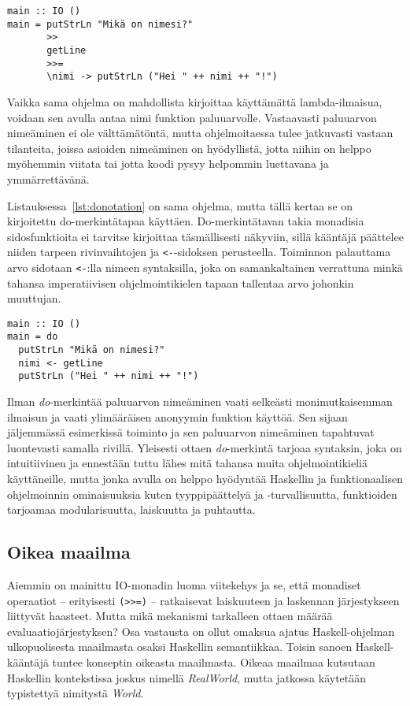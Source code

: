 \documentclass[finnish]{tktltiki2}
\begin{document}
\begin{lstlisting}[float,label={lst:desugared},caption={Funktionaalinen tyyli}]
main :: IO ()
main = putStrLn "Mikä on nimesi?"
       >>
       getLine
       >>=
       \nimi -> putStrLn ("Hei " ++ nimi ++ "!")
\end{lstlisting}

Vaikka sama ohjelma on mahdollista kirjoittaa käyttämättä lambda-ilmaisua, voidaan sen avulla antaa
nimi funktion  paluuarvolle. Vastaavasti paluuarvon nimeäminen ei ole välttämätöntä,
mutta ohjelmoitaessa tulee jatkuvasti vastaan tilanteita, joissa asioiden nimeäminen on hyödyllistä,
jotta niihin on helppo myöhemmin viitata tai jotta koodi pysyy helpommin luettavana ja
ymmärrettävänä.

Listauksessa~\ref{lst:donotation} on sama ohjelma, mutta tällä kertaa se on kirjoitettu
do-merkintätapaa käyttäen. Do-merkintätavan takia monadisia sidosfunktioita ei tarvitse kirjoittaa
täsmällisesti näkyviin, sillä kääntäjä päättelee niiden tarpeen rivinvaihtojen ja \verb|<-|-sidoksen
perusteella. Toiminnon  palauttama arvo sidotaan \verb|<-|:lla nimeen syntaksilla,
joka on samankaltainen verrattuna minkä tahansa imperatiivisen ohjelmointikielen tapaan tallentaa
arvo johonkin muuttujan.

\begin{lstlisting}[float,label={lst:donotation},caption={Imperatiivinen tyyli ja do-merkintätapa}]
main :: IO ()
main = do
  putStrLn "Mikä on nimesi?"
  nimi <- getLine
  putStrLn ("Hei " ++ nimi ++ "!")
\end{lstlisting}

Ilman \emph{do}-merkintää paluuarvon nimeäminen vaati selkeästi monimutkaisemman ilmaisun ja vaati
ylimääräisen anonyymin funktion käyttöä. Sen sijaan jäljemmässä esimerkissä toiminto ja sen
paluuarvon nimeäminen tapahtuvat luontevasti samalla rivillä. Yleisesti ottaen \emph{do}-merkintä
tarjoaa syntaksin, joka on intuitiivinen ja ennestään tuttu lähes mitä tahansa muita
ohjelmointikieliä käyttäneille, mutta jonka avulla on helppo hyödyntää Haskellin ja funktionaalisen
ohjelmoinnin ominaisuuksia kuten tyyppipäättelyä ja -turvallisuutta, funktioiden tarjoamaa
modularisuutta, laiskuutta ja puhtautta.

\subsection{Oikea maailma}

Aiemmin on mainittu IO-monadin luoma viitekehys ja se, että monadiset operaatiot -- erityisesti
\verb|(>>=)| -- ratkaisevat laiskuuteen ja laskennan järjestykseen liittyvät haasteet. Mutta mikä
mekanismi tarkalleen ottaen määrää evaluaatiojärjestyksen? Osa vastausta on ollut omaksua ajatus
Haskell-ohjelman ulkopuolisesta maailmasta osaksi Haskellin semantiikkaa. Toisin sanoen
Haskell-kääntäjä tuntee konseptin oikeasta maailmasta. Oikeaa maailmaa kutsutaan Haskellin
kontekstissa joskus nimellä \emph{RealWorld}, mutta jatkossa käytetään typistettyä nimitystä
\emph{World}.
\end{document}
